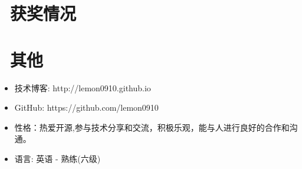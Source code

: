 \documentclass{resume}
\begin{document}
\section{\faHeartO\ 获奖情况}

\section{\faInfo\ 其他}
\begin{itemize}[parsep=0.5ex]
  \item 技术博客: http://lemon0910.github.io
  \item GitHub: https://github.com/lemon0910
  \item 性格：热爱开源,参与技术分享和交流，积极乐观，能与人进行良好的合作和沟通。
  \item 语言: 英语 - 熟练(六级)
\end{itemize}

%
%
\end{document}
